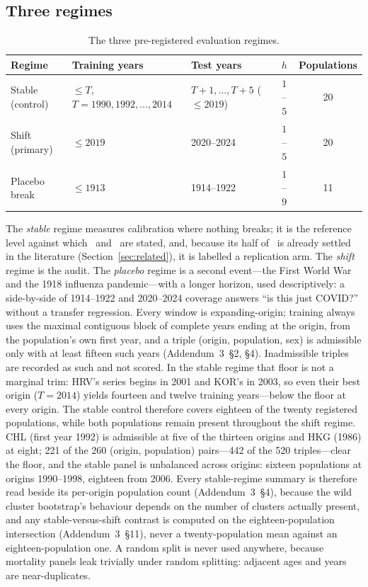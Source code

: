 \subsection{Three regimes}
\label{sec:design-regimes}

\begin{table}[htbp]\centering
\caption{The three pre-registered evaluation regimes.}
\label{tab:regimes}
\small
\begin{tabular}{@{}lllcc@{}}
\toprule
Regime & Training years & Test years & $h$ & Populations \\
\midrule
Stable (control) & $\le T$, $T=1990,1992,\dots,2014$ & $T{+}1,\dots,T{+}5$ ($\le 2019$) & $1$--$5$ & 20 \\
Shift (primary)  & $\le 2019$ & 2020--2024 & $1$--$5$ & 20 \\
Placebo break    & $\le 1913$ & 1914--1922 & $1$--$9$ & 11 \\
\bottomrule
\end{tabular}
\end{table}

The \emph{stable} regime measures calibration where nothing breaks; it is
the reference level against which \Htwo\ and \Hfive\ are stated, and,
because its half of \Htwo\ is already settled in the literature
(Section~\ref{sec:related}), it is labelled a replication arm. The
\emph{shift} regime is the audit. The \emph{placebo} regime is a second
event---the First World War and the 1918 influenza pandemic---with a longer
horizon, used descriptively: a side-by-side of 1914--1922 and 2020--2024
coverage answers ``is this just COVID?'' without a transfer regression.
Every window is expanding-origin; training always uses the maximal
contiguous block of complete years ending at the origin, from the
population's own first year, and a triple (origin, population, sex) is
admissible only with at least fifteen such years (Addendum~3~\S2, \S4).
Inadmissible triples are recorded as such and not scored. In the stable
regime that floor is not a marginal trim: HRV's series begins in 2001 and
KOR's in 2003, so even their best origin ($T=2014$) yields fourteen and
twelve training years---below the floor at every origin. The stable
control therefore covers eighteen of the twenty registered populations,
while both populations remain present throughout the shift regime. CHL
(first year 1992) is admissible at five of the thirteen origins and HKG
(1986) at eight; 221 of the 260 (origin, population) pairs---442 of the
520 triples---clear the floor, and the stable panel is unbalanced across
origins: sixteen populations at origins 1990--1998, eighteen from 2006.
Every stable-regime summary is therefore read beside its per-origin
population count (Addendum~3~\S4), because the wild cluster bootstrap's
behaviour depends on the number of clusters actually present, and any
stable-versus-shift contrast is computed on the eighteen-population
intersection (Addendum~3~\S11), never a twenty-population mean against an
eighteen-population one. A random split
is never used anywhere, because mortality panels leak trivially under
random splitting: adjacent ages and years are near-duplicates.

